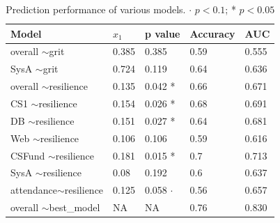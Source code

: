 \documentclass[sigconf]{acmart}
\begin{document}

\begin{table}[]
\caption{Prediction performance of various models. $\cdot$ $p < 0.1$; * $p < 0.05$}
\begin{tabular}{lllll}
\hline
\multicolumn{1}{|l|}{\textbf{Model}} & \multicolumn{1}{l|}{\textbf{$x_1$}} & \multicolumn{1}{l|}{\textbf{p value}} & \multicolumn{1}{l|}{\textbf{Accuracy}} & \multicolumn{1}{l|}{\textbf{AUC}} \\ \hline
overall $\sim$grit                   & 0.385                              & 0.385                                 & 0.59                                   & 0.555                             \\
SysA $\sim$grit                      & 0.724                              & 0.119                                 & 0.64                                   & 0.636  \\ \hline
overall $\sim$resilience             & 0.135                              & 0.042 *                               & 0.66                                   & 0.671                             \\
CS1 $\sim$resilience                 & 0.154                              & 0.026 *                               & 0.68                                   & 0.691                             \\
DB $\sim$resilience                  & 0.151                              & 0.027 *                               & 0.64                                   & 0.681                             \\
Web $\sim$resilience                 & 0.106                              & 0.106                                 & 0.59                                   & 0.616                             \\
CSFund $\sim$resilience              & 0.181                              & 0.015 *                               & 0.7                                    & 0.713                             \\
SysA $\sim$resilience                & 0.08                               & 0.192                                 & 0.6                                    & 0.637                             \\
attendance$\sim$resilience           & 0.125                              & 0.058 $\cdot$                               & 0.56                                   & 0.657                             \\ \hline
overall $\sim$best\_model            & NA                                 & NA                                    & 0.76                                   & 0.830                            
\end{tabular}
\label{tab:model_performance}
\end{table}
\end{document}
